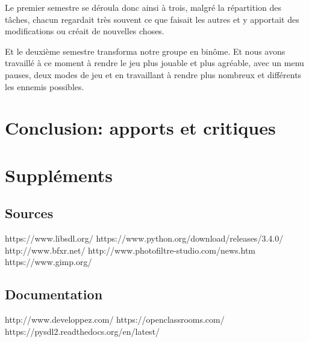 \documentclass{article}
\begin{document}
Le premier semestre se déroula donc ainsi à trois, malgré la répartition des
tâches, chacun regardait très souvent ce que faisait les autres et y apportait
des modifications ou créait de nouvelles choses. \newline

Et le deuxième semestre transforma notre groupe en binôme. Et nous avons
travaillé à ce moment à rendre le jeu plus jouable et plus agréable, avec un
menu pauses, deux modes de jeu et en travaillant à rendre plus nombreux et
différents les ennemis possibles.

\newpage

\section{Conclusion: apports et critiques}

\newpage

\section{Suppléments}

\subsection{Sources}

\noindent https://www.libsdl.org/ \newline
https://www.python.org/download/releases/3.4.0/ \newline
http://www.bfxr.net/ \newline
http://www.photofiltre-studio.com/news.htm \newline
https://www.gimp.org/


\subsection{Documentation}

\noindent http://www.developpez.com/ \newline
https://openclassrooms.com/ \newline
https://pysdl2.readthedocs.org/en/latest/
\end{document}
